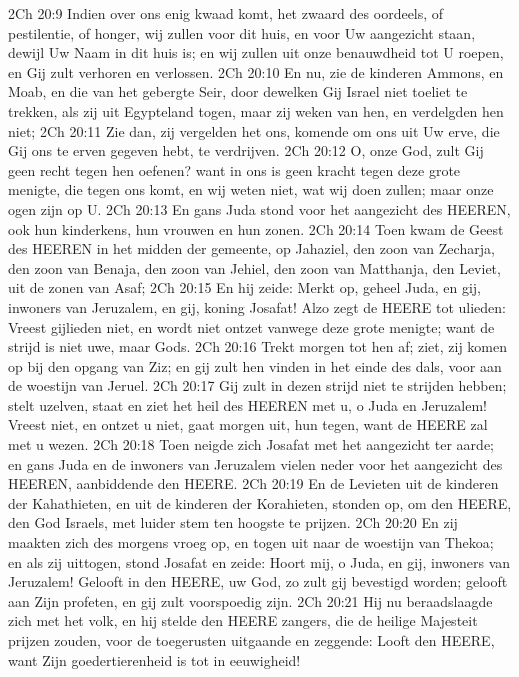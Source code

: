 2Ch 20:9  Indien over ons enig kwaad komt, het zwaard des oordeels, of pestilentie, of honger, wij zullen voor dit huis, en voor Uw aangezicht staan, dewijl Uw Naam in dit huis is; en wij zullen uit onze benauwdheid tot U roepen, en Gij zult verhoren en verlossen.
2Ch 20:10  En nu, zie de kinderen Ammons, en Moab, en die van het gebergte Seir, door dewelken Gij Israel niet toeliet te trekken, als zij uit Egypteland togen, maar zij weken van hen, en verdelgden hen niet;
2Ch 20:11  Zie dan, zij vergelden het ons, komende om ons uit Uw erve, die Gij ons te erven gegeven hebt, te verdrijven.
2Ch 20:12  O, onze God, zult Gij geen recht tegen hen oefenen? want in ons is geen kracht tegen deze grote menigte, die tegen ons komt, en wij weten niet, wat wij doen zullen; maar onze ogen zijn op U.
2Ch 20:13  En gans Juda stond voor het aangezicht des HEEREN, ook hun kinderkens, hun vrouwen en hun zonen.
2Ch 20:14  Toen kwam de Geest des HEEREN in het midden der gemeente, op Jahaziel, den zoon van Zecharja, den zoon van Benaja, den zoon van Jehiel, den zoon van Matthanja, den Leviet, uit de zonen van Asaf;
2Ch 20:15  En hij zeide: Merkt op, geheel Juda, en gij, inwoners van Jeruzalem, en gij, koning Josafat! Alzo zegt de HEERE tot ulieden: Vreest gijlieden niet, en wordt niet ontzet vanwege deze grote menigte; want de strijd is niet uwe, maar Gods.
2Ch 20:16  Trekt morgen tot hen af; ziet, zij komen op bij den opgang van Ziz; en gij zult hen vinden in het einde des dals, voor aan de woestijn van Jeruel.
2Ch 20:17  Gij zult in dezen strijd niet te strijden hebben; stelt uzelven, staat en ziet het heil des HEEREN met u, o Juda en Jeruzalem! Vreest niet, en ontzet u niet, gaat morgen uit, hun tegen, want de HEERE zal met u wezen.
2Ch 20:18  Toen neigde zich Josafat met het aangezicht ter aarde; en gans Juda en de inwoners van Jeruzalem vielen neder voor het aangezicht des HEEREN, aanbiddende den HEERE.
2Ch 20:19  En de Levieten uit de kinderen der Kahathieten, en uit de kinderen der Korahieten, stonden op, om den HEERE, den God Israels, met luider stem ten hoogste te prijzen.
2Ch 20:20  En zij maakten zich des morgens vroeg op, en togen uit naar de woestijn van Thekoa; en als zij uittogen, stond Josafat en zeide: Hoort mij, o Juda, en gij, inwoners van Jeruzalem! Gelooft in den HEERE, uw God, zo zult gij bevestigd worden; gelooft aan Zijn profeten, en gij zult voorspoedig zijn.
2Ch 20:21  Hij nu beraadslaagde zich met het volk, en hij stelde den HEERE zangers, die de heilige Majesteit prijzen zouden, voor de toegerusten uitgaande en zeggende: Looft den HEERE, want Zijn goedertierenheid is tot in eeuwigheid!
